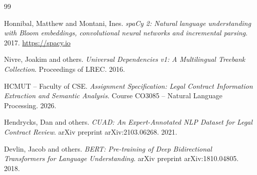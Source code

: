 \documentclass[12pt, a4paper]{article}
\begin{document}
\pagebreak
\tableofcontents
\pagebreak

\pagebreak

\begin{thebibliography}{99}

Honnibal, Matthew and Montani, Ines. \textit{spaCy 2: Natural language understanding with Bloom embeddings, convolutional neural networks and incremental parsing}. 2017. \url{https://spacy.io}

Nivre, Joakim and others. \textit{Universal Dependencies v1: A Multilingual Treebank Collection}. Proceedings of LREC. 2016.

HCMUT -- Faculty of CSE. \textit{Assignment Specification: Legal Contract Information Extraction and Semantic Analysis}. Course CO3085 -- Natural Language Processing. 2026.

Hendrycks, Dan and others. \textit{CUAD: An Expert-Annotated NLP Dataset for Legal Contract Review}. arXiv preprint arXiv:2103.06268. 2021.

Devlin, Jacob and others. \textit{BERT: Pre-training of Deep Bidirectional Transformers for Language Understanding}. arXiv preprint arXiv:1810.04805. 2018.

\end{thebibliography}

\pagebreak
\end{document}
